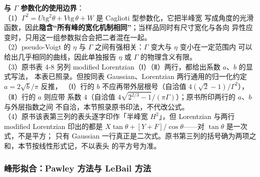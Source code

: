 \begin{pitfall}
\textbf{ 与 $\Gamma$ 参数化的使用边界}：\\
（1）$\Gamma^{2}=U\mathrm{tg}^{2}\theta+V\mathrm{tg}\,\theta+W$ 是 Caglioti 型参数化，它把半峰宽
写成角度的光滑函数，因此\textbf{隐含``所有峰的宽化机制相同''}；当样品同时有尺寸宽化与各向
异性应变时，只用这一组参数拟合会把二者混在一起。\\
（2）pseudo-Voigt 的 $\eta$ 与 $\Gamma$ 之间有强相关：$\Gamma$ 变大与 $\eta$ 变小在一定范围内
可以给出几乎相同的曲线，因此单独报告 $\eta$ 或 $\Gamma$ 的物理含义有限。\\
（3）原书表 4-8 另列 modified Lorentzian（Ⅰ）（Ⅱ）两行，都给出系数 $a$、$b$ 的显式写法，
本表已照录。但按同表 Gaussian、Lorentzian 两行通用的归一化约定 $a=2\sqrt{b}/\pi$ 反推，
（Ⅰ）行的 $b$ 不应再带外层根号（自洽值 $4(\sqrt{2}-1)/\Gamma^{2}$），（Ⅱ）行的 $a$ 则应带
系数 $4$（自洽值 $4\sqrt{2^{2/3}-1}/(\pi\Gamma)$）；原书所印两行的 $a$、$b$ 与外层指数之间
不自洽，本节照录原书印法，不代改公式。\\
（4）原书该表第三列的表头逐字印作「半峰宽 $H^{2}$」，但 Lorentzian 与两行 modified
Lorentzian 印出的都是 $X\tan\theta+[Y+F]/\cos\theta$——对 $\tan\theta$ 是一次式，不是平方；
只有 Gaussian 一行真正是二次式。原书第三列的括号确为两项之和，本节按线性形式记，不以表头
的平方号为准。
\end{pitfall}

\subsubsection{峰形拟合：Pawley 方法与 LeBail 方法}

